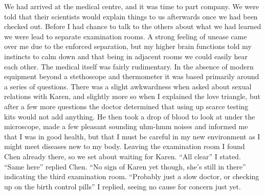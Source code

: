\documentclass[a4paper]{article}
\begin{document}
We had arrived at the medical centre, and it was time to part company. We were told that their scientists would explain things to us afterwards once we had been checked out. Before I had chance to talk to the others about what we had learned we were lead to separate examination rooms. A strong feeling of unease came over me due to the enforced separation, but my higher brain functions told my instincts to calm down and that being in adjacent rooms we could easily hear each other. The medical itself was fairly rudimentary. In the absence of modern equipment beyond a stethoscope and thermometer it was based primarily around a series of questions. There was a slight awkwardness when asked about sexual relations with Karen, and slightly more so when I explained the love triangle, but after a few more questions the doctor determined that using up scarce testing kits would not add anything. He then took a drop of blood to look at under the microscope, made a few pleasant sounding uhm-hmm noises and informed me that I was in good health, but that I must be careful in my new environment as I might meet diseases new to my body. Leaving the examination room I found Chen already there, so we set about waiting for Karen.
“All clear” I stated.
“Same here” replied Chen. “No sign of Karen yet though, she’s still in there” indicating the third examination room.
“Probably just a slow doctor, or checking up on the birth control pills” I replied, seeing no cause for concern just yet.
\end{document}

